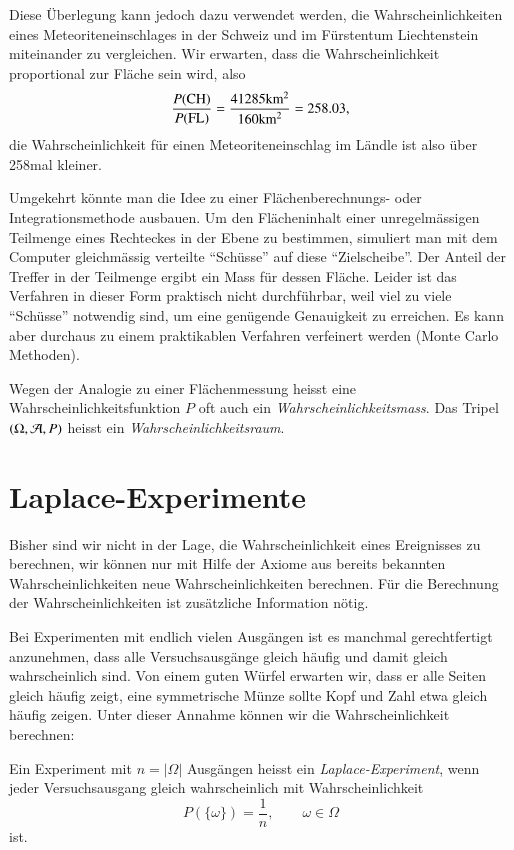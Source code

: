 Diese
Überlegung kann jedoch dazu verwendet werden, die Wahrscheinlichkeiten
eines Meteoriteneinschlages in der Schweiz und im Fürstentum Liechtenstein
miteinander zu vergleichen.
Wir erwarten, dass die Wahrscheinlichkeit
proportional zur Fläche sein wird, also
\[
\frac{P(\text{CH})}{P(\text{FL})}=
\frac{41285\text{km$\mathstrut^2$}}{160\text{km$\mathstrut^2$}}
=258.03,
\]
die Wahrscheinlichkeit für einen Meteoriteneinschlag im Ländle ist also
über 258mal kleiner.

Umgekehrt könnte man die Idee zu einer Flächenberechnungs- oder
Integra\-tions\-methode ausbauen.
Um den Flächeninhalt einer unregelmässigen
Teilmenge
eines Rechteckes in der Ebene zu bestimmen, simuliert man mit dem
Computer gleichmässig verteilte ``Schüsse'' auf diese ``Zielscheibe''.
Der Anteil der Treffer in der Teilmenge ergibt ein Mass für dessen
Fläche.
Leider ist das Verfahren in dieser Form praktisch nicht
durchführbar, weil viel zu viele ``Schüsse'' notwendig sind, um
eine genügende Genauigkeit zu erreichen.
Es kann aber durchaus
zu einem praktikablen Verfahren verfeinert werden (Monte Carlo Methoden).

Wegen
der Analogie zu einer Flächenmessung heisst eine
Wahrscheinlichkeitsfunktion $P$ oft auch ein {\em Wahrscheinlichkeitsmass}.
Das Tripel $(\Omega,{\cal A}, P)$ heisst ein {\em Wahrscheinlichkeitsraum}.

\section{Laplace-Experimente} \label{section-laplace-ereignisse}
Bisher sind wir nicht in der Lage, die Wahrscheinlichkeit eines Ereignisses
zu berechnen, wir können nur mit Hilfe der Axiome aus bereits bekannten
Wahrscheinlichkeiten neue Wahrscheinlichkeiten berechnen.
Für die Berechnung der Wahrscheinlichkeiten ist zusätzliche
Information nötig.

Bei Experimenten mit endlich vielen Ausgängen ist es manchmal gerechtfertigt
anzunehmen, dass alle Versuchsausgänge gleich häufig und damit gleich
wahrscheinlich sind.
Von einem guten Würfel erwarten wir, dass er alle Seiten gleich häufig
zeigt, eine symmetrische Münze sollte Kopf und Zahl etwa gleich häufig
zeigen.
Unter dieser Annahme können wir die Wahrscheinlichkeit berechnen:

\begin{definition}
Ein Experiment mit $n=|\Omega|$ Ausgängen heisst ein {\em Laplace-Experiment},
wenn jeder Versuchsausgang gleich wahrscheinlich mit Wahrscheinlichkeit
\[
P(\{\omega\})=\frac1n,\qquad\omega\in\Omega
\]
ist.
\end{definition}


